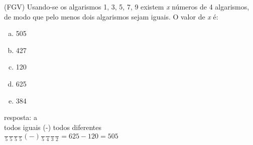 \begin{ex}
	(FGV) Usando-se os algarismos 1, 3, 5, 7, 9 existem \textit{x} números de 4 algarismos, de modo que pelo menos dois algarismos sejam iguais. O valor de \textit{x} é:
    \begin{enumerate}[(a)]
    \item 505
    \item 427
    \item 120
    \item 625
    \item 384
    \end{enumerate}
      \begin{sol}
        resposta: a \\
        todos iguais (-) todos diferentes \\
        $\frac{\phantom{A}}{5}\frac{\phantom{A}}{5}\frac{\phantom{A}}{5}\frac{\phantom{A}}{5} ( - )  \frac{\phantom{A}}{5}\frac{\phantom{A}}{4}\frac{\phantom{A}}{3}\frac{\phantom{A}}{2}= 625 - 120=505$
      \end{sol}
\end{ex}